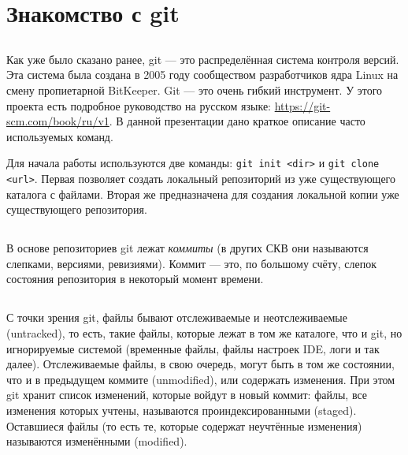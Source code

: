 \documentclass{article}
\begin{document}
\section{Знакомство с git}

\subsection{}
Как уже было сказано ранее, git --- это распределённая система контроля версий. Эта система была создана в 2005 году сообществом разработчиков ядра Linux на смену пропиетарной BitKeeper. Git --- это очень гибкий инструмент. У этого проекта есть подробное руководство на русском языке: {\color{blue} \url{https://git-scm.com/book/ru/v1}}. В данной презентации дано краткое описание часто используемых команд.

Для начала работы используются две команды: \texttt{git init <dir>} и \texttt{git clone <url>}. Первая позволяет создать локальный репозиторий из уже существующего каталога с файлами. Вторая же предназначена для создания локальной копии уже существующего репозитория.

\subsection{}
В основе репозиториев git лежат \emph{коммиты} (в других СКВ они называются слепками, версиями, ревизиями). Коммит --- это, по большому счёту, слепок состояния репозитория в некоторый момент времени. 

\subsection{}
С точки зрения git, файлы бывают отслеживаемые и неотслеживаемые (untracked), то есть, такие файлы, которые лежат в том же каталоге, что и git, но игнорируемые системой (временные файлы, файлы настроек IDE, логи и так далее). Отслеживаемые файлы, в свою очередь, могут быть в том же состоянии, что и в предыдущем коммите (unmodified), или содержать изменения. При этом git хранит список изменений, которые войдут в новый коммит: файлы, все изменения которых учтены, называются проиндексированными (staged). Оставшиеся файлы (то есть те, которые содержат неучтённые изменения) называются изменёнными (modified).
\end{document}
